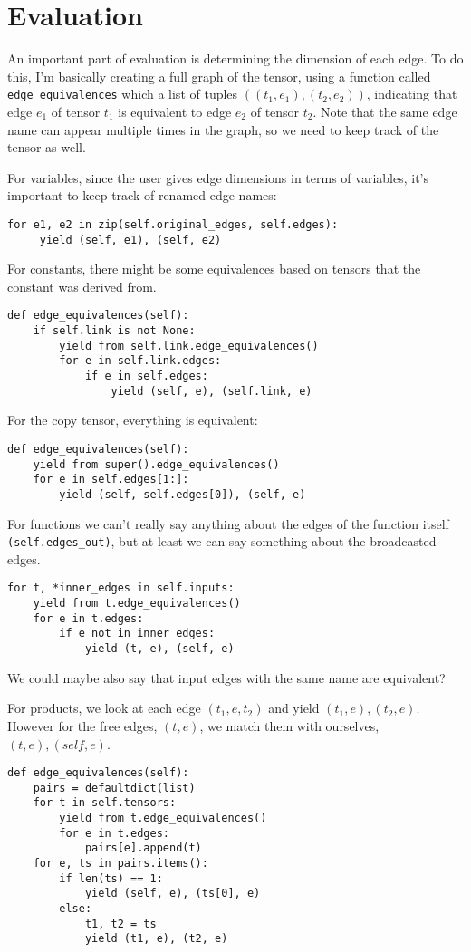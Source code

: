 \section{Evaluation}

An important part of evaluation is determining the dimension of each edge.
To do this, I'm basically creating a full graph of the tensor, using a function called
\texttt{edge\_equivalences} which a list of tuples $((t_1, e_1), (t_2, e_2))$,
indicating that edge $e_1$ of tensor $t_1$ is equivalent to edge $e_2$ of tensor $t_2$.
Note that the same edge name can appear multiple times in the graph, so we need to keep track of the tensor as well.

For variables, since the user gives edge dimensions in terms of variables, it's important to keep track of renamed edge names:
\begin{lstlisting}
for e1, e2 in zip(self.original_edges, self.edges):
     yield (self, e1), (self, e2)
\end{lstlisting}

For constants, there might be some equivalences based on tensors that the constant was derived from.
\begin{lstlisting}
def edge_equivalences(self):
    if self.link is not None:
        yield from self.link.edge_equivalences()
        for e in self.link.edges:
            if e in self.edges:
                yield (self, e), (self.link, e)
\end{lstlisting}

For the copy tensor, everything is equivalent:
\begin{lstlisting}
def edge_equivalences(self):
    yield from super().edge_equivalences()
    for e in self.edges[1:]:
        yield (self, self.edges[0]), (self, e)
\end{lstlisting}

For functions we can't really say anything about the edges of the function itself \texttt{(self.edges\_out)},
but at least we can say something about the broadcasted edges.
\begin{lstlisting}
for t, *inner_edges in self.inputs:
    yield from t.edge_equivalences()
    for e in t.edges:
        if e not in inner_edges:
            yield (t, e), (self, e)
\end{lstlisting}
We could maybe also say that input edges with the same name are equivalent?

For products, we look at each edge $(t_1, e, t_2)$ and yield $(t_1, e), (t_2, e)$.
However for the free edges, $(t, e)$, we match them with ourselves, $(t, e), (self, e)$.
\begin{lstlisting}
def edge_equivalences(self):
    pairs = defaultdict(list)
    for t in self.tensors:
        yield from t.edge_equivalences()
        for e in t.edges:
            pairs[e].append(t)
    for e, ts in pairs.items():
        if len(ts) == 1:
            yield (self, e), (ts[0], e)
        else:
            t1, t2 = ts
            yield (t1, e), (t2, e)
\end{lstlisting}


